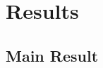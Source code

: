 \documentclass{article}
\begin{document}




\section{Results}
\label{sec:results}
\subsection{Main Result}
\end{document}
